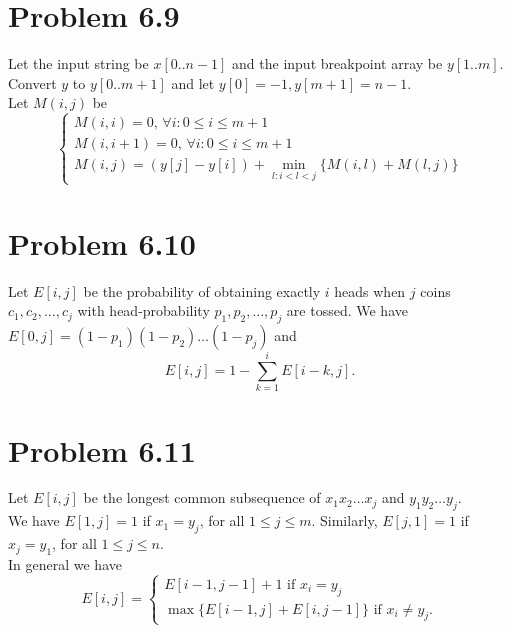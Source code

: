 \documentclass[12pt]{article}
\begin{document}
\section{Problem 6.9}
Let the input string be $x[0..n-1]$ and the input breakpoint array be $y[1..m]$. Convert $y$ to $y[0..m+1]$ and let $y[0] = -1, y[m+1] = n-1$. \\
Let $M(i,j)$ be 
$$\begin{cases} M(i,i)=0\text{, }\forall i: 0 \le i \le m + 1 \\
M(i,i + 1)=0\text{, }\forall i: 0 \le i \le m + 1\\
M(i,j)=\left(y[j]-y[i]\right) + \displaystyle \min_{l: i < l < j}\{M(i,l) + M(l,j)\}
\end{cases}$$

\section{Problem 6.10}
Let $E[i,j]$ be the probability of obtaining exactly $i$ heads when $j$ coins $c_1, c_2, \ldots, c_j$ with head-probability $p_1, p_2, \ldots, p_j$ are tossed.
We have $E[0,j] = (1-p_1)(1-p_2) \ldots (1-p_j)$ and $$E[i,j] = 1 - \sum_{k=1}^i E[i-k,j].$$

\section{Problem 6.11}
Let $E[i,j]$ be the longest common subsequence of $x_1 x_2 \ldots x_j$ and $y_1 y_2 \ldots y_j$. \\
We have $E[1,j] = 1$ if $x_1 = y_j$, for all $1 \le j \le m$. Similarly, $E[j,1] = 1$ if $x_j = y_1$, for all $1 \le j \le n$. \\
In general we have $$E[i,j] = \begin{cases} E[i-1,j-1] + 1 \text{ if } x_i = y_j \\ \max \{E[i-1,j] + E[i,j-1] \} \text{ if } x_i \ne y_j. \end{cases}$$
\end{document}
